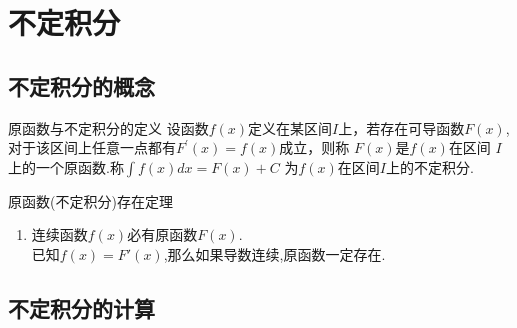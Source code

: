 \documentclass[8pt a4paper, oneside, UTF8]{ctexbook}
\begin{document}
\begin{sloppypar}
    \else
    \fi
    \chapter{不定积分}

    \section{不定积分的概念}
    \begin{defn}{原函数与不定积分的定义}{}
        设函数$f(x)$定义在某区间$I$上，若存在可导函数$F(x)$,对于该区间上任意一点都有$F^\prime(x)=f(x)$成立，则称 $F(x)$是$f(x)$在区间 $I$ 上的一个原函数.称$\int f(x)dx=F(x)+C$ 为$f(x)$在区间$I$上的不定积分.
    \end{defn}
    \begin{them}{原函数(不定积分)存在定理}{}
        \begin{enumerate}
            \item 连续函数$f(x)$必有原函数$F(x)$.\\
                  已知$f(x)=F'(x)$,那么如果导数连续,原函数一定存在.
        \end{enumerate}
    \end{them}

    \section{不定积分的计算}

    \ifx\allfiles\undefined
\end{sloppypar}
\end{document}
